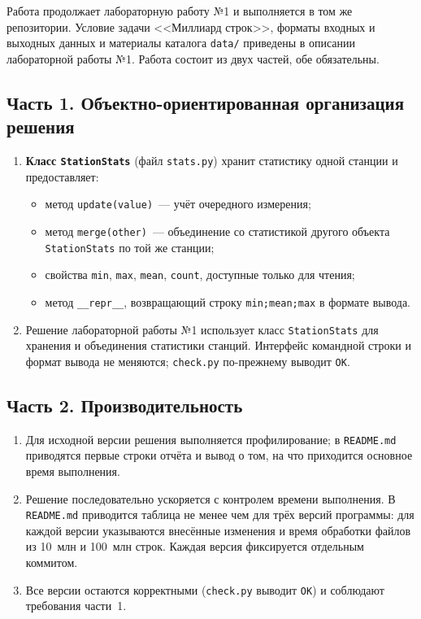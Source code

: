 \documentclass[11pt,a4paper]{article}
\newcommand{\code}[1]{\texttt{#1}}
\begin{document}
Работа продолжает лабораторную работу №1 и выполняется в том же репозитории. Условие задачи
<<Миллиард строк>>, форматы входных и выходных данных и материалы каталога \code{data/} приведены
в описании лабораторной работы №1. Работа состоит из двух частей, обе обязательны.

\subsection{Часть 1. Объектно-ориентированная организация решения}

\begin{enumerate}
  \item \textbf{Класс \code{StationStats}} (файл \code{stats.py}) хранит статистику одной станции
        и предоставляет:
  \begin{itemize}
    \item метод \code{update(value)}~— учёт очередного измерения;
    \item метод \code{merge(other)}~— объединение со статистикой другого объекта \code{StationStats}
          по той же станции;
    \item свойства \code{min}, \code{max}, \code{mean}, \code{count}, доступные только для чтения;
    \item метод \code{\_\_repr\_\_}, возвращающий строку \code{min;mean;max} в формате вывода.
  \end{itemize}
  \item Решение лабораторной работы №1 использует класс \code{StationStats} для хранения
        и объединения статистики станций. Интерфейс командной строки и формат вывода
        не меняются; \code{check.py} по-прежнему выводит \code{OK}.
\end{enumerate}

\subsection{Часть 2. Производительность}

\begin{enumerate}
  \item Для исходной версии решения выполняется профилирование; в
        \code{README.md} приводятся первые строки отчёта и вывод о том, на что приходится
        основное время выполнения.
  \item Решение последовательно ускоряется с контролем времени выполнения. В \code{README.md}
        приводится таблица не менее чем для трёх версий программы: для каждой версии указываются
        внесённые изменения и время обработки файлов из 10~млн и 100~млн строк. Каждая версия
        фиксируется отдельным коммитом.
  \item Все версии остаются корректными (\code{check.py} выводит \code{OK}) и соблюдают требования
        части~1.
\end{enumerate}
\end{document}
